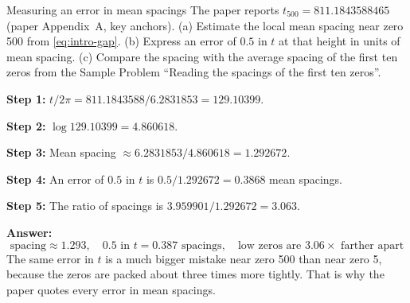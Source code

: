 \begin{sample}{Measuring an error in mean spacings}
The paper reports $t_{500} = 811.1843588465$ (paper Appendix~A, key anchors). (a) Estimate the local mean spacing near zero 500 from \cref{eq:intro-gap}. (b) Express an error of $0.5$ in $t$ at that height in units of mean spacing. (c) Compare the spacing with the average spacing of the first ten zeros from the Sample Problem ``Reading the spacings of the first ten zeros''.

\textbf{Step 1:} $t/2\pi = 811.1843588/6.2831853 = 129.10399$.

\textbf{Step 2:} $\log 129.10399 = 4.860618$.

\textbf{Step 3:} Mean spacing $\approx 6.2831853/4.860618 = 1.292672$.

\textbf{Step 4:} An error of $0.5$ in $t$ is $0.5/1.292672 = 0.3868$ mean spacings.

\textbf{Step 5:} The ratio of spacings is $3.959901/1.292672 = 3.063$.

\textbf{Answer:}
\[
\boxed{\text{spacing} \approx 1.293,\quad 0.5 \text{ in } t = 0.387 \text{ spacings},\quad \text{low zeros are } 3.06\times \text{ farther apart}}
\]
The same error in $t$ is a much bigger mistake near zero 500 than near zero 5, because the zeros are packed about three times more tightly. That is why the paper quotes every error in mean spacings.
\end{sample}

